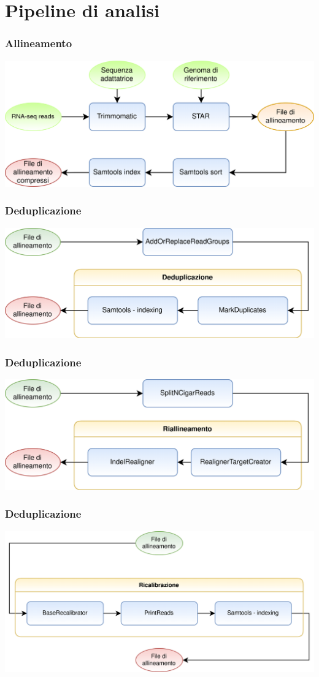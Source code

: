 \documentclass{beamer}
\begin{document}
	\section{Pipeline di analisi}
	\begin{frame}
		\frametitle{Allineamento}
		\includegraphics[width=\textwidth]{media/allineamento.png}
	\end{frame}
	\begin{frame}
		\frametitle{Deduplicazione}
		\includegraphics[width=\textwidth]{media/dedup.png}
	\end{frame}
	\begin{frame}
		\frametitle{Deduplicazione}
		\includegraphics[width=\textwidth]{media/riall.png}
	\end{frame}
	\begin{frame}
		\frametitle{Deduplicazione}
		\includegraphics[width=\textwidth]{media/recab.png}
	\end{frame}
\end{document}
